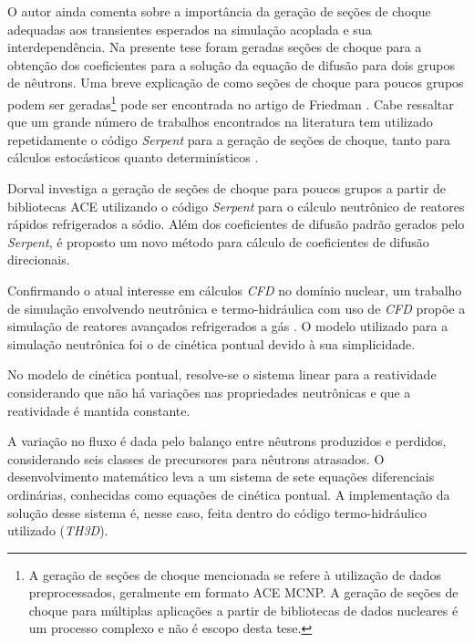 O autor ainda comenta sobre a importância da geração de seções de choque adequadas aos transientes esperados na 
simulação acoplada e sua interdependência. Na presente tese foram geradas seções de choque para a obtenção dos
coeficientes para a solução da equação de difusão para dois grupos de nêutrons.
Uma breve explicação de como seções de choque para poucos grupos podem ser geradas\footnote{A geração de seções de choque mencionada
  se refere à utilização de dados preprocessados, geralmente em formato ACE MCNP. A geração de seções de choque
  para múltiplas aplicações a partir de bibliotecas de dados nucleares é um processo complexo e não é escopo
desta tese.} pode ser encontrada no
artigo de Friedman \cite{Friedman2013}. Cabe ressaltar que um grande número de trabalhos encontrados
na literatura tem utilizado repetidamente o código \textit{Serpent} \cite{Serpent2013} para
a geração de seções de choque, tanto para cálculos estocásticos quanto determinísticos \cite{Jareteg2014}.

Dorval \cite{Dorval2015} investiga
a geração de seções de choque para poucos grupos a partir de bibliotecas ACE utilizando o código \textit{Serpent} para
o cálculo neutrônico de reatores rápidos refrigerados a sódio. Além dos coeficientes de
difusão padrão gerados pelo \textit{Serpent}, é proposto um novo método para cálculo de
coeficientes de difusão direcionais. 

Confirmando o atual interesse em cálculos \textit{CFD} no domínio nuclear, um trabalho de simulação envolvendo
neutrônica e termo-hidráulica com uso de \textit{CFD} propõe a simulação de reatores avançados refrigerados
a gás \cite{Hossain2011}. O modelo utilizado 
para a simulação neutrônica foi o de cinética pontual devido à sua simplicidade.



No modelo de cinética pontual, resolve-se o sistema linear para a reatividade considerando
que não há variações nas propriedades neutrônicas e que a reatividade é mantida constante.

A variação no fluxo é dada 
pelo balanço entre nêutrons produzidos e perdidos, considerando seis classes de precursores 
para nêutrons atrasados. O desenvolvimento matemático leva a um sistema de sete equações diferenciais 
ordinárias, conhecidas como equações de cinética pontual. A implementação da solução desse sistema 
é, nesse caso, feita dentro do código termo-hidráulico utilizado (\textit{TH3D}).

